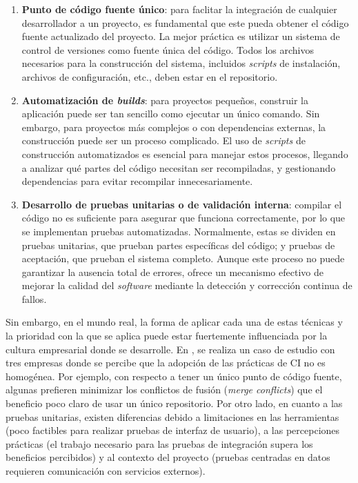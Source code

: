\begin{enumerate}
      \item \textbf{Punto de código fuente único}: para faclitar la integración de cualquier
      desarrollador a un proyecto, es fundamental que este pueda obtener el código fuente
      actualizado del proyecto. La mejor práctica es utilizar un sistema de control de versiones
      como fuente única del código. Todos los archivos necesarios para la construcción del sistema,
      incluidos \textit{scripts} de instalación, archivos de configuración, etc., deben estar
      en el repositorio.
      \item \textbf{Automatización de \textit{builds}}: para proyectos pequeños, construir la
      aplicación puede ser tan sencillo como ejecutar un único comando. Sin embargo, para proyectos
      más complejos o con dependencias externas, la construcción puede ser un proceso complicado.
      El uso de \textit{scripts} de construcción automatizados es esencial para manejar estos
      procesos, llegando a analizar qué partes del código necesitan ser recompiladas, y gestionando
      dependencias para evitar recompilar innecesariamente.
      \item \textbf{Desarrollo de pruebas unitarias o de validación interna}: compilar el código
      no es suficiente para asegurar que funciona correctamente, por lo que se
      implementan pruebas automatizadas. Normalmente, estas se dividen en pruebas unitarias, que
      prueban partes específicas del código; y pruebas de aceptación, que prueban el sistema
      completo. Aunque este proceso no puede garantizar la ausencia total de errores, ofrece un
      mecanismo efectivo de mejorar la calidad del \textit{software} mediante la detección y
      corrección continua de fallos.
\end{enumerate}

Sin embargo, en el mundo real, la forma de aplicar cada una de estas técnicas y la prioridad con
la que se aplica puede estar fuertemente influenciada por la cultura empresarial donde
se desarrolle. En \cite{8}, se realiza un caso de estudio con tres empresas donde se percibe
que la adopción de las prácticas de CI no es homogénea. Por ejemplo, con respecto a tener
un único punto de código fuente, algunas prefieren minimizar los conflictos de fusión
(\textit{merge conflicts}) que el beneficio poco claro de usar un único repositorio. Por otro
lado, en cuanto a las pruebas unitarias, existen diferencias debido a limitaciones en las
herramientas (poco factibles para realizar pruebas de interfaz de usuario), a las percepciones
prácticas (el trabajo necesario para las pruebas de integración supera los beneficios percibidos)
y al contexto del proyecto (pruebas centradas en datos requieren comunicación con servicios
externos).\\


